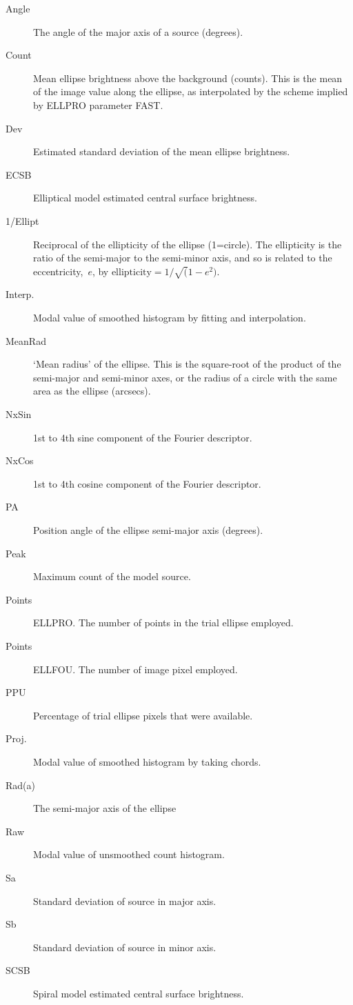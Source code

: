 \documentclass[twoside,11pt]{starlink}
\begin{document}
\begin{description}
\item[Angle]The angle of the major axis of a source (degrees).
\item[Count]Mean ellipse brightness above the background (counts).
This is the mean of the image value along the ellipse, as interpolated
by the scheme implied by ELLPRO parameter FAST.
\item[Dev]Estimated standard deviation of the mean ellipse brightness.
\item[ECSB]Elliptical model estimated central surface brightness.
\item[1/Ellipt]Reciprocal of the ellipticity of the ellipse
(1=circle).  The ellipticity is the ratio
of the semi-major to the semi-minor axis, and so is related to the
eccentricity,~$e$, by $\mbox{ellipticity}=1/\sqrt(1-e^2)$.
\item[Interp.]Modal value of smoothed histogram by fitting and interpolation.
\item[MeanRad]`Mean radius' of the ellipse.  This is the square-root of
the product of the semi-major and semi-minor axes, or the radius of a
circle with the same area as the ellipse (arcsecs).
\item[NxSin]1st to 4th sine component of the Fourier descriptor.
\item[NxCos]1st to 4th cosine component of the Fourier descriptor.
\item[PA]Position angle of the ellipse semi-major axis (degrees).
\item[Peak]Maximum count of the model source.
\item[Points]ELLPRO. The number of points in the trial ellipse employed.
\item[Points]ELLFOU. The number of image pixel employed.
\item[PPU]Percentage of trial ellipse pixels that were available.
\item[Proj.]Modal value of smoothed histogram by taking chords.
\item[Rad(a)]The semi-major axis of the ellipse
\item[Raw]Modal value of unsmoothed count histogram.
\item[Sa]Standard deviation of source in major axis.
\item[Sb]Standard deviation of source in minor axis.
\item[SCSB]Spiral model estimated central surface brightness.

\end{description}
\end{document}
